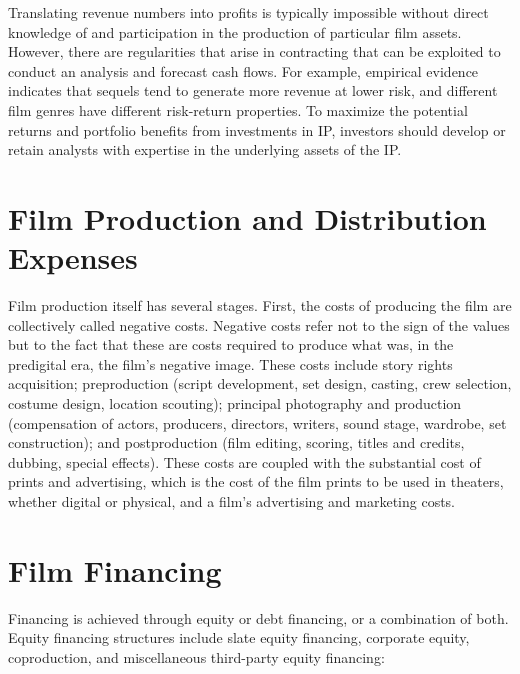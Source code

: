 \documentclass[11pt]{article}
\begin{document}
Translating revenue numbers into profits is typically impossible without direct knowledge of and participation in the production of particular film assets. However, there are regularities that arise in contracting that can be exploited to conduct an analysis and forecast cash flows. For example, empirical evidence indicates that sequels tend to generate more revenue at lower risk, and different film genres have different risk-return properties. To maximize the potential returns and portfolio benefits from investments in IP, investors should develop or retain analysts with expertise in the underlying assets of the IP.

\section*{Film Production and Distribution Expenses}
Film production itself has several stages. First, the costs of producing the film are collectively called negative costs. Negative costs refer not to the sign of the values but to the fact that these are costs required to produce what was, in the predigital era, the film's negative image. These costs include story rights acquisition; preproduction (script development, set design, casting, crew selection, costume design, location scouting); principal photography and production (compensation of actors, producers, directors, writers, sound stage, wardrobe, set construction); and postproduction (film editing, scoring, titles and credits, dubbing, special effects). These costs are coupled with the substantial cost of prints and advertising, which is the cost of the film prints to be used in theaters, whether digital or physical, and a film's advertising and marketing costs.

\section*{Film Financing}
Financing is achieved through equity or debt financing, or a combination of both. Equity financing structures include slate equity financing, corporate equity, coproduction, and miscellaneous third-party equity financing:
\end{document}

